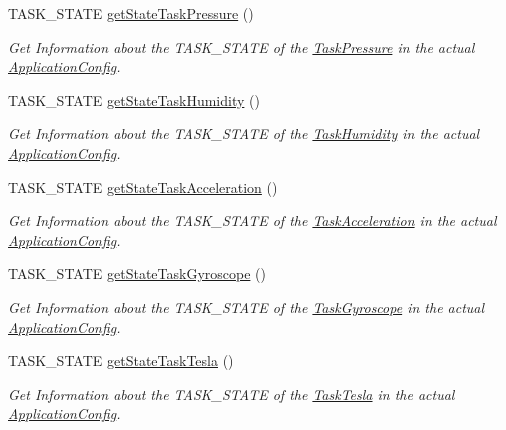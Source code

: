 \begin{DoxyCompactItemize}
T\+A\+S\+K\+\_\+\+S\+T\+A\+T\+E \hyperlink{class_application_config_a323496444c1cc7f0644af849b3507ef9}{get\+State\+Task\+Pressure} ()
\begin{DoxyCompactList}\small\item\em Get Information about the T\+A\+S\+K\+\_\+\+S\+T\+A\+T\+E of the \hyperlink{class_task_pressure}{Task\+Pressure} in the actual \hyperlink{class_application_config}{Application\+Config}. \end{DoxyCompactList}\item 
T\+A\+S\+K\+\_\+\+S\+T\+A\+T\+E \hyperlink{class_application_config_aeed94fd363443012646032bd8b3e7825}{get\+State\+Task\+Humidity} ()
\begin{DoxyCompactList}\small\item\em Get Information about the T\+A\+S\+K\+\_\+\+S\+T\+A\+T\+E of the \hyperlink{class_task_humidity}{Task\+Humidity} in the actual \hyperlink{class_application_config}{Application\+Config}. \end{DoxyCompactList}\item 
T\+A\+S\+K\+\_\+\+S\+T\+A\+T\+E \hyperlink{class_application_config_ada8bad1fd11e05859df18da19d0ae5cc}{get\+State\+Task\+Acceleration} ()
\begin{DoxyCompactList}\small\item\em Get Information about the T\+A\+S\+K\+\_\+\+S\+T\+A\+T\+E of the \hyperlink{class_task_acceleration}{Task\+Acceleration} in the actual \hyperlink{class_application_config}{Application\+Config}. \end{DoxyCompactList}\item 
T\+A\+S\+K\+\_\+\+S\+T\+A\+T\+E \hyperlink{class_application_config_a59b565a031e180c4a036a1ddefb9a938}{get\+State\+Task\+Gyroscope} ()
\begin{DoxyCompactList}\small\item\em Get Information about the T\+A\+S\+K\+\_\+\+S\+T\+A\+T\+E of the \hyperlink{class_task_gyroscope}{Task\+Gyroscope} in the actual \hyperlink{class_application_config}{Application\+Config}. \end{DoxyCompactList}\item 
T\+A\+S\+K\+\_\+\+S\+T\+A\+T\+E \hyperlink{class_application_config_a7876da43ca65156d6fb4c1b6acc9d5e2}{get\+State\+Task\+Tesla} ()
\begin{DoxyCompactList}\small\item\em Get Information about the T\+A\+S\+K\+\_\+\+S\+T\+A\+T\+E of the \hyperlink{class_task_tesla}{Task\+Tesla} in the actual \hyperlink{class_application_config}{Application\+Config}. \end{DoxyCompactList}\item 

\end{DoxyCompactItemize}
